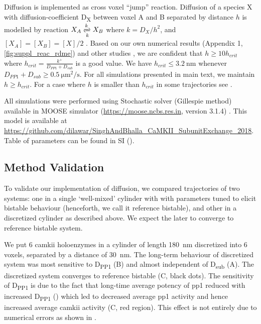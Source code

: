 \documentclass[9pt,lineno,doublespacing]{elife}
\newcommand\SUB[2]{#1\textsubscript{#2}}
\begin{document}
Diffusion is implemented as cross voxel ``jump'' reaction. Diffusion of a
species X with diffusion-coefficient \SUB{D}{X} between voxel A and B separated
by distance $h$ is modelled by reaction $X_A \xrightleftharpoons[k]{k} X_B$
where \( k={D_X}/{h^2}\), and \([X_A]=[X_B]=[X]/2 \)
\citep{erban_practical_2007}. Based on our own numerical results (Appendix 1, \autoref{fig:suppl_reac_rdme}) and
other studies \citep{isaacson_reaction-diffusion_2009,erban_stochastic_2009}, we
are confident that \( h \ge 10h_{crit}\) where
\(h_{crit}=\frac{k^+}{D_{PP1}+D_{sub}}\) is a good value. We have \( h_{crit} \le \SI{3.2}{\nano\meter} \)
whenever $D_{PP1}+D_{sub}\ge\SI{0.5}{\micro\meter\squared\per\second}$. For all
simulations presented in main text, we maintain $h\ge h_{crit}$. For a case
where $h$ is smaller than $h_{crit}$ in some trajectories see
. 

All simulations were performed using Stochastic solver (Gillespie method)
available in MOOSE simulator (\url{https://moose.ncbs.res.in}, version 3.1.4)
\citep{ray_pymoose:_2008}. This model is available
at \url{https://github.com/dilawar/SinghAndBhalla_CaMKII_SubunitExchange_2018}.
Table of parameters can be found in SI ().

\subsection{Method Validation}

To validate our implementation of diffusion, we compared trajectories of two
systems: one in a single `well-mixed' cylinder with with parameters tuned to
elicit bistable behaviour (henceforth, we call it reference bistable), and other
in a discretized cylinder as described above. We expect the later to converge to
reference bistable system. 

We put 6 \gls{camkii} holoenzymes in a cylinder of length \SI{180}{\nano\meter}
discretized into 6 voxels, separated by a distance of \SI{30}{\nano\meter}. The
long-term behaviour of discretized system was most sensitive to \SUB{D}{PP1}
(B) and almost independent of \SUB{D}{sub}
(A). The discretized system converges to reference
bistable (C, black dots). The sensitivity of \SUB{D}{PP1}
is due to the fact that long-time average potency of \gls{pp1} reduced with
increased \SUB{D}{PP1}
() which led to
decreased average \gls{pp1} activity and hence increased average \gls{camkii}
activity (C, red region). This effect is not entirely due
to numerical errors as shown in . 
\end{document}
